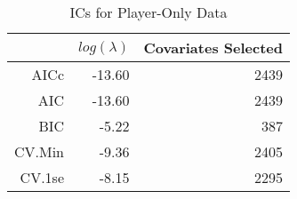 \begin{table}[ht]
\centering
\begin{tabular}{rrr}
  \hline
 & $log(\lambda)$ & Covariates Selected \\ 
  \hline
AICc & -13.60 & 2439 \\ 
  AIC & -13.60 & 2439 \\ 
  BIC & -5.22 & 387 \\ 
  CV.Min & -9.36 & 2405 \\ 
  CV.1se & -8.15 & 2295 \\ 
   \hline
\end{tabular}
\caption{ICs for Player-Only Data} 
\label{tab:pl_ic}
\end{table}
